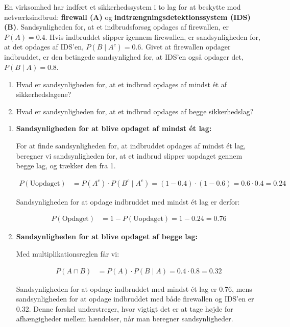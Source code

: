 \begin{example}
En virksomhed har indført et sikkerhedssystem i to lag for at beskytte mod netværksindbrud: \textbf{firewall (A)} og \textbf{indtrængningsdetektionssystem (IDS) (B)}. Sandsynligheden for, at et indbrudsforsøg opdages af firewallen, er \( P(A) = 0.4 \). Hvis indbruddet slipper igennem firewallen, er sandsynligheden for, at det opdages af IDS'en, \( P(B \mid A^c) = 0.6 \). Givet at firewallen opdager indbruddet, er den betingede sandsynlighed for, at IDS'en også opdager det, \( P(B \mid A) = 0.8 \).

\begin{enumerate}[label=(\alph*)]
    \item Hvad er sandsynligheden for, at et indbrud opdages af mindst ét af sikkerhedslagene?
    \item Hvad er sandsynligheden for, at et indbrud opdages af begge sikkerhedslag?
\end{enumerate}

\end{example}

\begin{solution}
\begin{enumerate}[label=(\alph*)]
    \item \textbf{Sandsynligheden for at blive opdaget af mindst ét lag:}

    For at finde sandsynligheden for, at indbruddet opdages af mindst ét lag, beregner vi sandsynligheden for, at et indbrud slipper uopdaget gennem begge lag, og trækker den fra 1.

    \begin{align*}
        P(\text{Uopdaget}) &= P(A^c) \cdot P(B^c \mid A^c) 
        = (1 - 0.4) \cdot (1 - 0.6) 
        = 0.6 \cdot 0.4
        = 0.24
    \end{align*}

    Sandsynligheden for at opdage indbruddet med mindst ét lag er derfor:

    \begin{align*}
    P(\text{Opdaget}) &= 1 - P(\text{Uopdaget}) = 1 - 0.24 = 0.76
    \end{align*}

    \item \textbf{Sandsynligheden for at blive opdaget af begge lag:}

    Med multiplikationsreglen får vi:

    \begin{align*}
    P(A \cap B) &= P(A) \cdot P(B \mid A) = 0.4 \cdot 0.8 = 0.32
    \end{align*}

    Sandsynligheden for at opdage indbruddet med mindst ét lag er 0.76, mens sandsynligheden for at opdage indbruddet med både firewallen og IDS'en er 0.32. Denne forskel understreger, hvor vigtigt det er at tage højde for afhængigheder mellem hændelser, når man beregner sandsynligheder.
\end{enumerate}
\end{solution}

